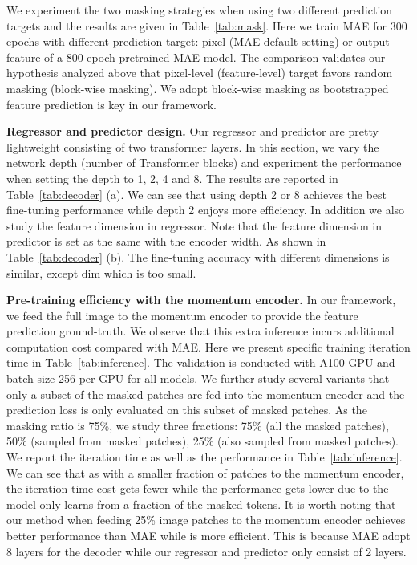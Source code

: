 \documentclass[runningheads]{llncs}
\begin{document}
We experiment the two masking strategies when using two different prediction targets and the results are given in Table~\ref{tab:mask}. Here we train MAE for 300 epochs with different prediction target: pixel (MAE default setting) or output feature of a 800 epoch pretrained MAE model.
The comparison validates our hypothesis analyzed above that pixel-level (feature-level) target favors random masking (block-wise masking). 
We adopt block-wise masking as bootstrapped feature prediction is key in our framework.

\vspace{2mm}
\noindent \textbf{Regressor and predictor design.}
Our regressor and predictor are pretty lightweight consisting of two transformer layers. In this section, we vary the network depth (number of Transformer blocks)
and experiment the performance when setting the depth to 1, 2, 4 and 8.
The results are reported in Table~\ref{tab:decoder} (a).
We can see that using depth 2 or 8 achieves the best fine-tuning performance while depth 2 enjoys more efficiency.
In addition we also study the feature dimension in regressor. Note that the feature dimension in predictor is set as the same with the encoder width. 
As shown in Table~\ref{tab:decoder} (b).
The fine-tuning accuracy with different dimensions is similar, except dim which is too small.

\vspace{2mm}
\noindent \textbf{Pre-training efficiency with the momentum encoder.}
In our framework, we feed the full image to the momentum encoder to provide the feature prediction ground-truth. 
We observe that this extra inference incurs additional computation cost compared with MAE.
Here we present specific training iteration time in Table~\ref{tab:inference}.
The validation is conducted with A100 GPU and batch size 256 per GPU for all models.
We further study several variants that only a subset of the masked patches are fed into the momentum encoder and the prediction loss is only evaluated on this subset of masked patches. As the masking ratio is 75\%, we study three fractions: 75\% (all the masked patches), 50\% (sampled from masked patches), 25\% (also sampled from masked patches). We report the iteration time as well as the performance in Table~\ref{tab:inference}. We can see that as with a smaller fraction of patches to the momentum encoder, the iteration time cost gets fewer while the performance gets lower due to the model only learns from a fraction of the masked tokens.
It is worth noting that our method when feeding 25\% image patches to the momentum encoder achieves better performance than MAE while is more efficient.
This is because MAE adopt 8 layers for the decoder while our regressor and predictor only consist of 2 layers.
\end{document}
